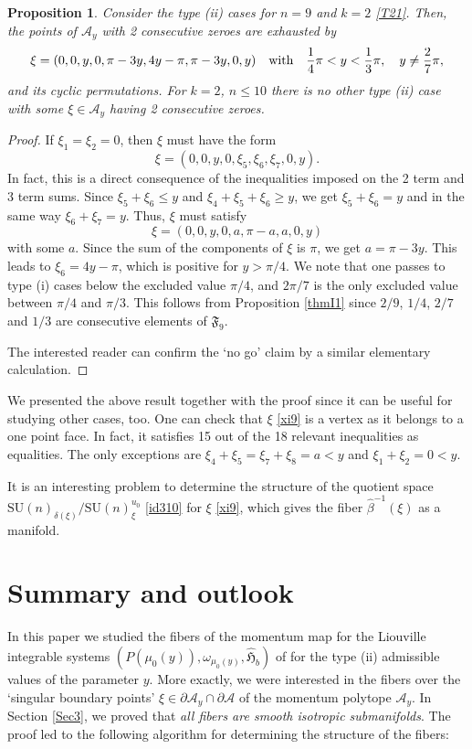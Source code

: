 \documentclass[a4paper,11pt,reqno]{amsart}
\newtheorem{prop}[thm]{Proposition}
\theoremstyle{definition}
\numberwithin{equation}{section}
\newcommand{\be}{\begin{equation}}
\newcommand{\ee}{\end{equation}}
\def\cA{{\mathcal A}}                       %
\def\SU{\mathrm{SU}}                        %
\def\fH{{\mathfrak{H}}}                     %
\def\fF{{\mathfrak F}}                      %
\begin{document}
\begin{prop}\label{prop56}
Consider the type (ii) cases for $n=9$ and $k=2$ \eqref{T21}. Then, the points of $\cA_y$ with 2 consecutive zeroes are exhausted by
\be
\xi = (0,0,y, 0, \pi - 3y, 4y - \pi, \pi - 3y, 0,y)
\quad
\hbox{with}\quad
 \frac{1}{4} \pi  < y  <  \frac{1}{3} \pi,\quad y\neq \frac{2}{7}\pi,
\ee
and its cyclic permutations.
For $k=2$, $n\leq 10$ there is no other type (ii) case with some $\xi\in \cA_y$ having 2 consecutive zeroes.
\end{prop}
\begin{proof}
If $\xi_1=\xi_2=0$, then $\xi$ must have the form
\be
\xi=(0,0,y,0, \xi_5,\xi_6,\xi_7, 0,y).
\ee
In fact, this is a direct consequence of the inequalities imposed on the 2 term and 3 term sums.
Since $\xi_5 + \xi_6 \leq y$ and $\xi_4 + \xi_5 + \xi_6 \geq y$, we get $\xi_5 + \xi_6 =y$
and in the same way $\xi_6 + \xi_7 = y$. Thus, $\xi$ must satisfy
\be
\xi=(0,0,y,0, a,\pi -a,a, 0,y)
\label{xi9}\ee
with some $a$. Since the sum of the components of $\xi$ is $\pi$, we get $a= \pi - 3y$.
This  leads to $\xi_6= 4y - \pi$, which is positive for $y > \pi/4$.
We note that one passes to type (i) cases below the excluded value $\pi/4$,
and $2\pi/7$ is the only excluded value between $\pi/4$ and $\pi/3$.
 This follows from Proposition \ref{thmI1} since  $2/9$, $1/4$, $2/7$ and $1/3$
 are consecutive elements of $\fF_9$.

The interested reader can confirm the `no go' claim by a similar elementary calculation.
\end{proof}

We presented the above result together with the proof since it
can be useful for studying other cases, too.
One can check that $\xi$ \eqref{xi9} is a  vertex as it belongs to a one point face.
In fact, it satisfies 15 out of the 18 relevant inequalities as equalities.
The only exceptions are $\xi_4 + \xi_5 = \xi_7 + \xi_8 = a <y$ and $\xi_1 + \xi_2 = 0 < y$.

 It is an interesting problem to determine the structure of the quotient space
 $\SU(n)_{\delta(\xi)}/\SU(n)_\xi^{u_0}$ \eqref{id310}
for $\xi$ \eqref{xi9}, which gives the fiber $\hat \beta^{-1}(\xi)$ as a manifold.

\section{Summary and outlook}\label{Sec6}

In this paper we studied the fibers of the momentum map for the Liouville integrable systems
$(P(\mu_0(y)), \omega_{\mu_0(y)}, \hat \fH_b)$ of \cite{FK}
 for the type (ii) admissible values of the parameter $y$.
More exactly, we were interested in the fibers over the `singular boundary points' $\xi \in \partial \cA_y \cap \partial \cA$
of the momentum polytope $\cA_y$.
In Section \ref{Sec3}, we proved that \emph{all fibers are smooth isotropic submanifolds}.
The proof led to the following algorithm for
determining the structure of the fibers:
\end{document}
